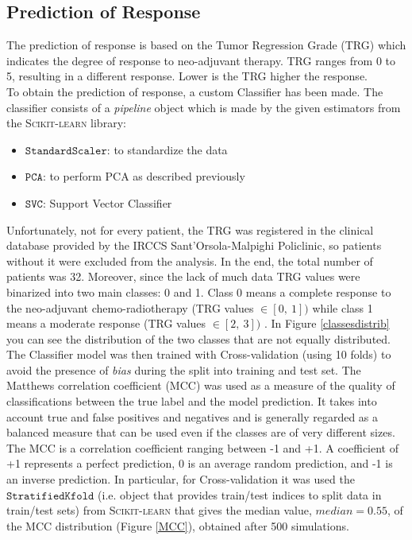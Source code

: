 \documentclass{standalone}
\begin{document}
\subsection{Prediction of Response}

The prediction of response is based on the Tumor Regression Grade (TRG) which indicates the degree of response to neo-adjuvant therapy\cite{tesicoppola}. TRG ranges from 0 to 5, resulting in a different response. Lower is the TRG higher the response. 
\\
To obtain the prediction of response, a custom Classifier has been made.
The classifier consists of a \textit{pipeline} object which is made by the given estimators from the \textsc{Scikit-learn} library: 
\begin{itemize}
    \item $\mathtt{StandardScaler}$: to standardize the data
    \item $\mathtt{PCA}$: to perform PCA as described previously
    \item $\mathtt{SVC}$: Support Vector Classifier
\end{itemize}
Unfortunately, not for every patient, the TRG was registered in the clinical database provided by the IRCCS Sant'Orsola-Malpighi Policlinic, so patients without it were excluded from the analysis.
In the end, the total number of patients was 32. 
Moreover, since the lack of much data TRG values were binarized into two main classes: 0 and 1.
Class 0 means a complete response to the neo-adjuvant chemo-radiotherapy (TRG values $ \in [0, \: 1])$ while class 1 means a moderate response (TRG values $ \in [2, \: 3])$ .
In Figure \ref{classesdistrib} you can see the distribution of the two classes that are not equally distributed.\\
The Classifier model was then trained with Cross-validation (using 10 folds) to avoid the presence of \textit{bias} during the split into training and test set.
The Matthews correlation coefficient (MCC) was used as a  measure of the quality of classifications between the true label and the model prediction. 
It takes into account true and false positives and negatives and is generally regarded as a balanced measure that can be used even if the classes are of very different sizes. 
The MCC is a correlation coefficient ranging between -1 and +1. 
A coefficient of +1 represents a perfect prediction, 0 is an average random prediction, and -1 is an inverse prediction.
In particular, for Cross-validation it was used the $\mathtt{StratifiedKfold}$ (i.e. object that provides train/test indices to split data in train/test sets) from \textsc{Scikit-learn} that gives the median value, $median = 0.55$, of the MCC distribution (Figure \ref{MCC}), obtained after 500 simulations.
\end{document}
